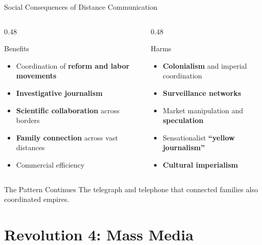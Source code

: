 \documentclass[aspectratio=169]{beamer}
\begin{document}
\begin{frame}{Social Consequences of Distance Communication}
\begin{columns}
\begin{column}{0.48\textwidth}
\begin{block}{\faThumbsUp\hspace{0.3em}Benefits}
\begin{itemize}
  \item Coordination of \textbf{reform and labor movements}
  \item \textbf{Investigative journalism}
  \item \textbf{Scientific collaboration} across borders
  \item \textbf{Family connection} across vast distances
  \item Commercial efficiency
\end{itemize}
\end{block}
\end{column}

\begin{column}{0.48\textwidth}
\begin{alertblock}{\faThumbsDown\hspace{0.3em}Harms}
\begin{itemize}
  \item \textbf{Colonialism} and imperial coordination
  \item \textbf{Surveillance networks}
  \item Market manipulation and \textbf{speculation}
  \item Sensationalist \textbf{``yellow journalism''}
  \item \textbf{Cultural imperialism}
\end{itemize}
\end{alertblock}
\end{column}
\end{columns}

\vspace{0.5em}
\begin{exampleblock}{The Pattern Continues}
The telegraph and telephone that connected families also coordinated empires.
\end{exampleblock}
\end{frame}


\section{Revolution 4: Mass Media}
\end{document}
